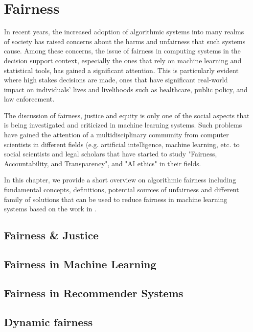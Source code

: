 \chapter{Fairness}
\label{fairness}

In recent years, the increased adoption of algorithmic systems into many realms of society has raised concerns about the harms and unfairness that such systems cause. Among these concerns, the issue of fairness in computing systems in the decision support context, especially the ones that rely on machine learning and statistical tools, has gained a significant attention\cite{mitchell2021algorithmic}. This is particularly evident where high stakes decisions are made, ones that have significant real-world impact on individuals’ lives and livelihoods such as healthcare, public policy, and law enforcement.

The discussion of fairness, justice and equity is only one of the social aspects that is being investigated and criticized in machine learning systems. Such problems have gained the attention of a multidisciplinary community from computer scientists in different fields (e.g. artificial intelligence, machine learning, etc. to social scientists and legal scholars that have started to study "Fairness, Accountability, and Transparency", and "AI ethics" in their fields.

In this chapter, we provide a short overview on algorithmic fairness including fundamental concepts, definitions, potential sources of unfairness and different family of solutions that can be used to reduce fairness in machine learning systems based on the work in \cite{mitchell2021algorithmic,barocas2016big,barocas2018fairness}.


\section{Fairness \& Justice}



\section{Fairness in Machine Learning}


\section{Fairness in Recommender Systems}


\section{Dynamic fairness}

